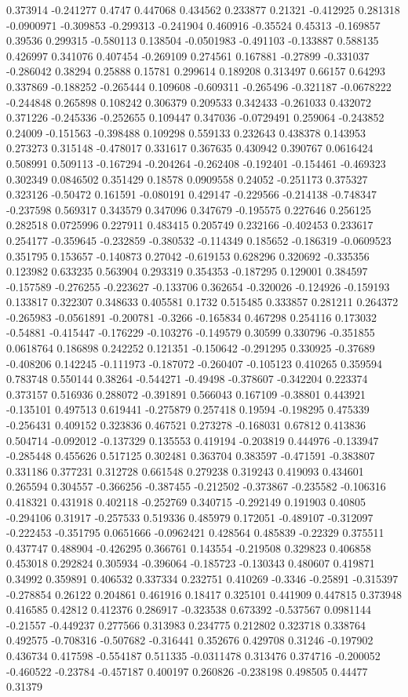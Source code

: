 0.373914 -0.241277 0.4747 0.447068 0.434562 0.233877 0.21321 -0.412925 0.281318 -0.0900971 -0.309853 -0.299313 -0.241904 0.460916 -0.35524 0.45313 -0.169857 0.39536 0.299315 -0.580113 0.138504 -0.0501983 -0.491103 -0.133887 0.588135 0.426997 0.341076 0.407454 -0.269109 0.274561 0.167881 -0.27899 -0.331037 -0.286042 0.38294 0.25888 0.15781 0.299614 0.189208 0.313497 0.66157 0.64293 0.337869 -0.188252 -0.265444 0.109608 -0.609311 -0.265496 -0.321187 -0.0678222 -0.244848 0.265898 0.108242 0.306379 0.209533 0.342433 -0.261033 0.432072 0.371226 -0.245336 -0.252655 0.109447 0.347036 -0.0729491 0.259064 -0.243852 0.24009 -0.151563 -0.398488 0.109298 0.559133 0.232643 0.438378 0.143953 0.273273 0.315148 -0.478017 0.331617 0.367635 0.430942 0.390767 0.0616424 0.508991 0.509113 -0.167294 -0.204264 -0.262408 -0.192401 -0.154461 -0.469323 0.302349 0.0846502 0.351429 0.18578 0.0909558 0.24052 -0.251173 0.375327 0.323126 -0.50472 0.161591 -0.080191 0.429147 -0.229566 -0.214138 -0.748347 -0.237598 0.569317 0.343579 0.347096 0.347679 -0.195575 0.227646 0.256125 0.282518 0.0725996 0.227911 0.483415 0.205749 0.232166 -0.402453 0.233617 0.254177 -0.359645 -0.232859 -0.380532 -0.114349 0.185652 -0.186319 -0.0609523 0.351795 0.153657 -0.140873 0.27042 -0.619153 0.628296 0.320692 -0.335356 0.123982 0.633235 0.563904 0.293319 0.354353 -0.187295 0.129001 0.384597 -0.157589 -0.276255 -0.223627 -0.133706 0.362654 -0.320026 -0.124926 -0.159193 0.133817 0.322307 0.348633 0.405581 0.1732 0.515485 0.333857 0.281211 0.264372 -0.265983 -0.0561891 -0.200781 -0.3266 -0.165834 0.467298 0.254116 0.173032 -0.54881 -0.415447 -0.176229 -0.103276 -0.149579 0.30599 0.330796 -0.351855 0.0618764 0.186898 0.242252 0.121351 -0.150642 -0.291295 0.330925 -0.37689 -0.408206 0.142245 -0.111973 -0.187072 -0.260407 -0.105123 0.410265 0.359594 0.783748 0.550144 0.38264 -0.544271 -0.49498 -0.378607 -0.342204 0.223374 0.373157 0.516936 0.288072 -0.391891 0.566043 0.167109 -0.38801 0.443921 -0.135101 0.497513 0.619441 -0.275879 0.257418 0.19594 -0.198295 0.475339 -0.256431 0.409152 0.323836 0.467521 0.273278 -0.168031 0.67812 0.413836 0.504714 -0.092012 -0.137329 0.135553 0.419194 -0.203819 0.444976 -0.133947 -0.285448 0.455626 0.517125 0.302481 0.363704 0.383597 -0.471591 -0.383807 0.331186 0.377231 0.312728 0.661548 0.279238 0.319243 0.419093 0.434601 0.265594 0.304557 -0.366256 -0.387455 -0.212502 -0.373867 -0.235582 -0.106316 0.418321 0.431918 0.402118 -0.252769 0.340715 -0.292149 0.191903 0.40805 -0.294106 0.31917 -0.257533 0.519336 0.485979 0.172051 -0.489107 -0.312097 -0.222453 -0.351795 0.0651666 -0.0962421 0.428564 0.485839 -0.22329 0.375511 0.437747 0.488904 -0.426295 0.366761 0.143554 -0.219508 0.329823 0.406858 0.453018 0.292824 0.305934 -0.396064 -0.185723 -0.130343 0.480607 0.419871 0.34992 0.359891 0.406532 0.337334 0.232751 0.410269 -0.3346 -0.25891 -0.315397 -0.278854 0.26122 0.204861 0.461916 0.18417 0.325101 0.441909 0.447815 0.373948 0.416585 0.42812 0.412376 0.286917 -0.323538 0.673392 -0.537567 0.0981144 -0.21557 -0.449237 0.277566 0.313983 0.234775 0.212802 0.323718 0.338764 0.492575 -0.708316 -0.507682 -0.316441 0.352676 0.429708 0.31246 -0.197902 0.436734 0.417598 -0.554187 0.511335 -0.0311478 0.313476 0.374716 -0.200052 -0.460522 -0.23784 -0.457187 0.400197 0.260826 -0.238198 0.498505 0.44477 0.31379 